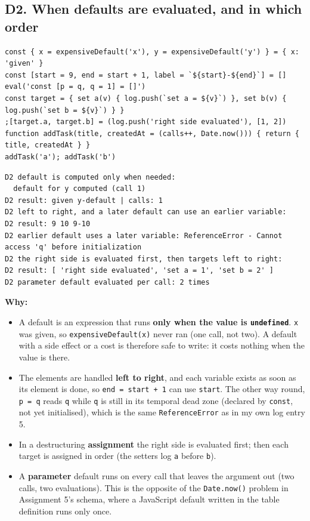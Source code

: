 \documentclass[
  10pt,
]{article}
\providecommand{\tightlist}{%
  \setlength{\itemsep}{0pt}\setlength{\parskip}{0pt}}
\begin{document}
\hypertarget{d2-when-defaults-are-evaluated-and-in-which-order}{%
\subsection{D2. When defaults are evaluated, and in which
order}\label{d2-when-defaults-are-evaluated-and-in-which-order}}

\begin{verbatim}
const { x = expensiveDefault('x'), y = expensiveDefault('y') } = { x: 'given' }
const [start = 9, end = start + 1, label = `${start}-${end}`] = []
eval('const [p = q, q = 1] = []')
const target = { set a(v) { log.push(`set a = ${v}`) }, set b(v) { log.push(`set b = ${v}`) } }
;[target.a, target.b] = (log.push('right side evaluated'), [1, 2])
function addTask(title, createdAt = (calls++, Date.now())) { return { title, createdAt } }
addTask('a'); addTask('b')
\end{verbatim}

\begin{verbatim}
D2 default is computed only when needed:
  default for y computed (call 1)
D2 result: given y-default | calls: 1
D2 left to right, and a later default can use an earlier variable:
D2 result: 9 10 9-10
D2 earlier default uses a later variable: ReferenceError - Cannot access 'q' before initialization
D2 the right side is evaluated first, then targets left to right:
D2 result: [ 'right side evaluated', 'set a = 1', 'set b = 2' ]
D2 parameter default evaluated per call: 2 times
\end{verbatim}

\textbf{Why:}

\begin{itemize}
\tightlist
\item
  A default is an expression that runs \textbf{only when the value is
  \texttt{undefined}}. \texttt{x} was given, so
  \texttt{expensiveDefault(\allowbreak{}\textquotesingle{}x\allowbreak{}\textquotesingle{})}
  never ran (one call, not two). A default with a side effect or a cost
  is therefore safe to write: it costs nothing when the value is there.
\item
  The elements are handled \textbf{left to right}, and each variable
  exists as soon as its element is done, so \texttt{end\ =\ start\ +\ 1}
  can use \texttt{start}. The other way round, \texttt{p\ =\ q} reads
  \texttt{q} while \texttt{q} is still in its temporal dead zone
  (declared by \texttt{const}, not yet initialised), which is the same
  \texttt{ReferenceError} as in my own log entry 5.
\item
  In a destructuring \textbf{assignment} the right side is evaluated
  first; then each target is assigned in order (the setters log
  \texttt{a} before \texttt{b}).
\item
  A \textbf{parameter} default runs on every call that leaves the
  argument out (two calls, two evaluations). This is the opposite of the
  \texttt{Date.\allowbreak{}now()} problem in Assignment 5's schema,
  where a JavaScript default written in the table definition runs only
  once.
\end{itemize}
\end{document}
